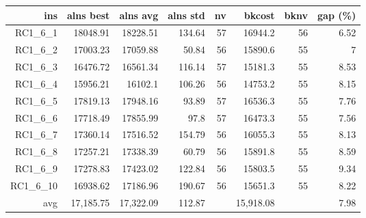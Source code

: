   \begin{table}[caption={Kết quả đo với tập HG\_RC\_1\_6 600 yêu cầu}, label=exp:HGRC16]
    \small
    \centering
    \begin{tabular}{rrrrrrrr}
    \hline
    ins & alns best & alns avg & alns std & nv & bkcost & bknv & gap (\%) \\ \hline
    RC1\_6\_1 & 18048.91 & 18228.51 & 134.64 & 57 & 16944.2 & 56 & 6.52 \\ \hline
    RC1\_6\_2 & 17003.23 & 17059.88 & 50.84 & 56 & 15890.6 & 55 & 7 \\ \hline
    RC1\_6\_3 & 16476.72 & 16561.34 & 116.14 & 57 & 15181.3 & 55 & 8.53 \\ \hline
    RC1\_6\_4 & 15956.21 & 16102.1 & 106.26 & 56 & 14753.2 & 55 & 8.15 \\ \hline
    RC1\_6\_5 & 17819.13 & 17948.16 & 93.89 & 57 & 16536.3 & 55 & 7.76 \\ \hline
    RC1\_6\_6 & 17718.49 & 17855.99 & 97.8 & 57 & 16473.3 & 55 & 7.56 \\ \hline
    RC1\_6\_7 & 17360.14 & 17516.52 & 154.79 & 56 & 16055.3 & 55 & 8.13 \\ \hline
    RC1\_6\_8 & 17257.21 & 17338.39 & 60.79 & 56 & 15891.8 & 55 & 8.59 \\ \hline
    RC1\_6\_9 & 17278.83 & 17423.02 & 122.84 & 56 & 15803.5 & 55 & 9.34 \\ \hline
    RC1\_6\_10 & 16938.62 & 17186.96 & 190.67 & 56 & 15651.3 & 55 & 8.22 \\ \hline
    avg & 17,185.75 & 17,322.09 & 112.87 & & 15,918.08 & & 7.98 \\ \hline
    \end{tabular}
  \end{table}

